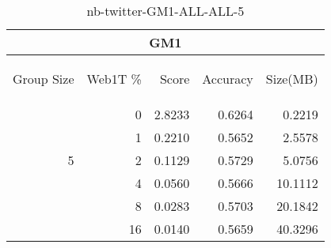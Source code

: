 \begin{center}
\begin{table}[htbp] 
 \begin{center}
\begin{tabular}{ | r | r | r | r | r |}
\hline
\multicolumn{5}{|c|}{GM1}\\
\hline
\begin{sideways}Group Size\end{sideways} & \begin{sideways}Web1T \%\end{sideways} & \begin{sideways}Score\end{sideways} & \begin{sideways}Accuracy\end{sideways} & \begin{sideways}Size(MB)\end{sideways}\\
\hline
\multirow{5}{*}{5}
 & 0 & 2.8233 & 0.6264 & 0.2219\\ \cline{2-5}
 & 1 & 0.2210 & 0.5652 & 2.5578\\ \cline{2-5}
 & 2 & 0.1129 & 0.5729 & 5.0756\\ \cline{2-5}
 & 4 & 0.0560 & 0.5666 & 10.1112\\ \cline{2-5}
 & 8 & 0.0283 & 0.5703 & 20.1842\\ \cline{2-5}
 & 16 & 0.0140 & 0.5659 & 40.3296\\ \cline{2-5}
\hline
\end{tabular}
\caption{nb-twitter-GM1-ALL-ALL-5}
\label{table:nb-twitter-GM1-ALL-ALL-5}
\end{center}
 \end{table}
\end{center}

